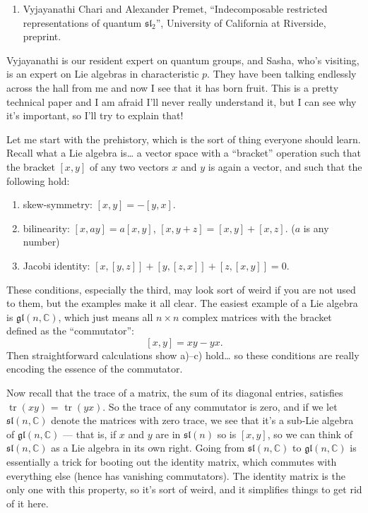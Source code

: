 \documentclass{article}
\def\tightlist{}
\begin{document}
\begin{enumerate}
\def\labelenumi{\arabic{enumi})}
\tightlist
\item
  Vyjayanathi Chari and Alexander Premet, ``Indecomposable restricted
  representations of quantum \(\mathfrak{sl}_2\)'', University of
  California at Riverside, preprint.
\end{enumerate}

Vyjayanathi is our resident expert on quantum groups, and Sasha, who's
visiting, is an expert on Lie algebras in characteristic \(p\). They
have been talking endlessly across the hall from me and now I see that
it has born fruit. This is a pretty technical paper and I am afraid I'll
never really understand it, but I can see why it's important, so I'll
try to explain that!

Let me start with the prehistory, which is the sort of thing everyone
should learn. Recall what a Lie algebra is\ldots{} a vector space with a
``bracket'' operation such that the bracket \([x,y]\) of any two vectors
\(x\) and \(y\) is again a vector, and such that the following hold:

\begin{enumerate}
\def\labelenumi{\alph{enumi})}
\tightlist
\item
  skew-symmetry: \([x,y] = -[y,x]\).
\item
  bilinearity: \([x,ay] = a[x,y]\), \([x,y+z] = [x,y] + [x,z]\). (\(a\)
  is any number)
\item
  Jacobi identity: \([x,[y,z]] + [y,[z,x]] + [z,[x,y]] = 0\).
\end{enumerate}

These conditions, especially the third, may look sort of weird if you
are not used to them, but the examples make it all clear. The easiest
example of a Lie algebra is \(\mathfrak{gl}(n,\mathbb{C})\), which just
means all \(n\times n\) complex matrices with the bracket defined as the
``commutator'': \[[x,y] = xy-yx.\] Then straightforward calculations
show a)--c) hold\ldots{} so these conditions are really encoding the
essence of the commutator.

Now recall that the trace of a matrix, the sum of its diagonal entries,
satisfies \(\operatorname{tr}(xy)\) = \(\operatorname{tr}(yx)\). So the
trace of any commutator is zero, and if we let
\(\mathfrak{sl}(n,\mathbb{C})\) denote the matrices with zero trace, we
see that it's a sub-Lie algebra of \(\mathfrak{gl}(n,\mathbb{C})\) ---
that is, if \(x\) and \(y\) are in \(\mathfrak{sl}(n)\) so is \([x,y]\),
so we can think of \(\mathfrak{sl}(n,\mathbb{C})\) as a Lie algebra in
its own right. Going from \(\mathfrak{sl}(n,\mathbb{C})\) to
\(\mathfrak{gl}(n,\mathbb{C})\) is essentially a trick for booting out
the identity matrix, which commutes with everything else (hence has
vanishing commutators). The identity matrix is the only one with this
property, so it's sort of weird, and it simplifies things to get rid of
it here.
\end{document}
